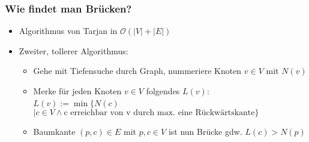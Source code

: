 \begin{frame}
	\frametitle{Wie findet man Brücken?}
	\begin{itemize}
		\item Algorithmus von Tarjan in $\mathcal{O}(|V| + |E|)$
		\item Zweiter, tollerer Algorithmus:
			\begin{itemize}
				\item Gehe mit Tiefensuche durch Graph, nummeriere Knoten $v \in V$ mit $N(v)$
				\item Merke für jeden Knoten $v \in V$ folgendes $L(v)$:\\
					 $ L(v) := \min\{ N(c) $ ~\\ $ \mid c \in V \wedge \text{c erreichbar von v durch max. eine Rückwärtskante} \} $
				\item Baumkante $(p,c) \in E$  mit $p,c \in V$ ist nun Brücke gdw. $L(c) > N(p)$
			\end{itemize}
	\end{itemize}

\end{frame}

